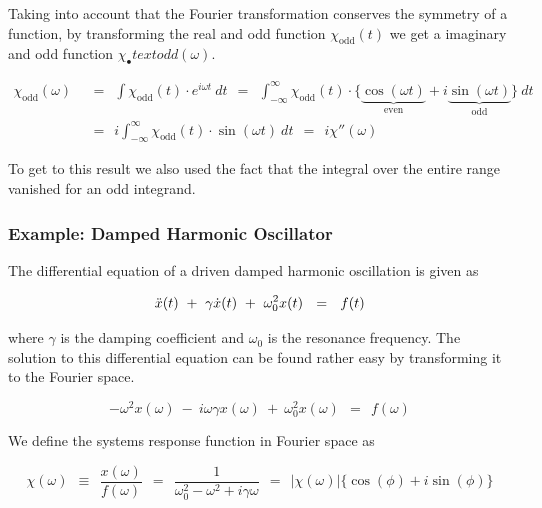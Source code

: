 \documentclass[10pt]{report}
\numberwithin{equation}{chapter}
\begin{document}
Taking into account that the Fourier transformation conserves the symmetry of a function, by transforming the real and odd function $\chi_\text{odd}(t)$ we get a imaginary and odd function $\chi_\textbf{•}text{odd}(\omega)$.


\begin{align}
  \chi_\text{odd}(\omega) ~~& =~~ \int \chi_\text{odd}(t) \cdot e^{i\omega t}\ dt
  ~~=~~ \int_{-\infty}^\infty \chi_\text{odd}(t) \cdot
  \{ \underbrace{\cos(\omega t)}_\text{even} + i\underbrace{\sin(\omega t)}_\text{odd} \}\ dt \nonumber \\
  ~~& =~~ i \int_{-\infty}^{\infty} \chi_\text{odd}(t) \cdot \sin(\omega t)\ dt ~~=~~ i\chi''(\omega)
\end{align}


To get to this result we also used the fact that the integral over the entire range vanished for an odd integrand.


\subsubsection{Example: Damped Harmonic Oscillator}

The differential equation of a driven damped harmonic oscillation is given as

\begin{equation} \label{eq:damped_osc_DE}
  \Ddot{x}(t) ~+~ \gamma \dot{x}(t) ~+~ \omega_0^2 x(t) ~~=~~ f(t)
\end{equation}

where $\gamma$ is the damping coefficient and $\omega_0$ is the resonance frequency.
The solution to this differential equation can be found rather easy by transforming it to the Fourier space.

\begin{equation}
  -\omega^2 x(\omega) ~-~ i \omega \gamma x(\omega) ~+~ \omega_0^2 x(\omega) ~~=~~ f(\omega)
\end{equation}


We define the systems response function in Fourier space as

\begin{equation} \label{eq:damped_osc_response}
  \chi(\omega) 
  ~~\equiv~~ \frac{x(\omega)}{f(\omega)} 
  ~~=~~ \frac{1}{\omega_0^2 - \omega^2 + i\gamma\omega} 
  ~~=~~ | \chi(\omega)| \{\cos(\phi) + i\sin(\phi) \}
\end{equation}
\end{document}
